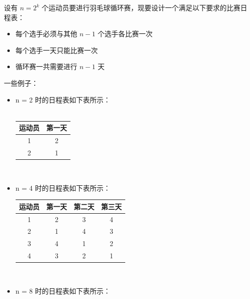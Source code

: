 \documentclass[12pt,a4paper]{article}
\begin{document}
设有 $n=2^k$ 个运动员要进行羽毛球循环赛，现要设计一个满足以下要求的比赛日程表：

\begin{itemize}[noitemsep]
    \item 每个选手必须与其他 $n-1$ 个选手各比赛一次
    \item 每个选手一天只能比赛一次
    \item 循环赛一共需要进行 $n-1$ 天
\end{itemize}

一些例子：

\begin{itemize}
    \item n = 2 时的日程表如下表所示：\\ \\
          \begin{tabular}{cc}
              \toprule
              运动员 & 第一天 \\
              \midrule
              1   & 2   \\
              2   & 1   \\
              \bottomrule
          \end{tabular} \\

    \item n = 4 时的日程表如下表所示：

          \begin{tabular}{cccc}
              \toprule
              运动员 & 第一天 & 第二天 & 第三天 \\
              \midrule
              1   & 2   & 3   & 4   \\
              2   & 1   & 4   & 3   \\
              3   & 4   & 1   & 2   \\
              4   & 3   & 2   & 1   \\
              \bottomrule
          \end{tabular} \\

    \item n = 8 时的日程表如下表所示：


\end{itemize}
\end{document}

